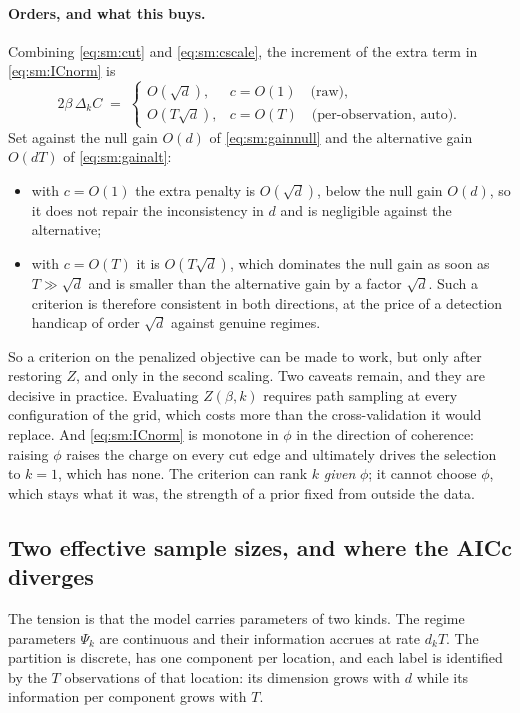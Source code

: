 \documentclass[11pt]{article}
\begin{document}
\paragraph{Orders, and what this buys.} Combining \eqref{eq:sm:cut} and \eqref{eq:sm:cscale}, the increment of the extra term in \eqref{eq:sm:ICnorm} is
\begin{equation}\label{eq:sm:penorder}
  2\beta\,\Delta_k C \;=\;
  \begin{cases}
    O\!\left(\sqrt{d}\right), & c = O(1) \quad \text{(raw)},\\[2pt]
    O\!\left(T\sqrt{d}\right), & c = O(T) \quad \text{(per-observation, auto)} .
  \end{cases}
\end{equation}
Set against the null gain $O(d)$ of \eqref{eq:sm:gainnull} and the alternative gain $O(dT)$ of \eqref{eq:sm:gainalt}:
\begin{itemize}[leftmargin=1.4em,itemsep=2pt,topsep=3pt]
  \item with $c = O(1)$ the extra penalty is $O(\sqrt d)$, below the null gain $O(d)$, so it does not repair the inconsistency in $d$ and is negligible against the alternative;
  \item with $c = O(T)$ it is $O(T\sqrt d)$, which dominates the null gain as soon as $T \gg \sqrt d$ and is smaller than the alternative gain by a factor $\sqrt d$. Such a criterion is therefore consistent in both directions, at the price of a detection handicap of order $\sqrt{d}$ against genuine regimes.
\end{itemize}
So a criterion on the penalized objective can be made to work, but only after restoring $Z$, and only in the second scaling. Two caveats remain, and they are decisive in practice. Evaluating $Z(\beta,k)$ requires path sampling at every configuration of the grid, which costs more than the cross-validation it would replace. And \eqref{eq:sm:ICnorm} is monotone in $\phi$ in the direction of coherence: raising $\phi$ raises the charge on every cut edge and ultimately drives the selection to $k = 1$, which has none. The criterion can rank $k$ \emph{given} $\phi$; it cannot choose $\phi$, which stays what it was, the strength of a prior fixed from outside the data.

\subsection{Two effective sample sizes, and where the AICc diverges}

The tension is that the model carries parameters of two kinds. The regime parameters $\Psi_k$ are continuous and their information accrues at rate $d_k T$. The partition is discrete, has one component per location, and each label is identified by the $T$ observations of that location: its dimension grows with $d$ while its information per component grows with $T$.
\end{document}
